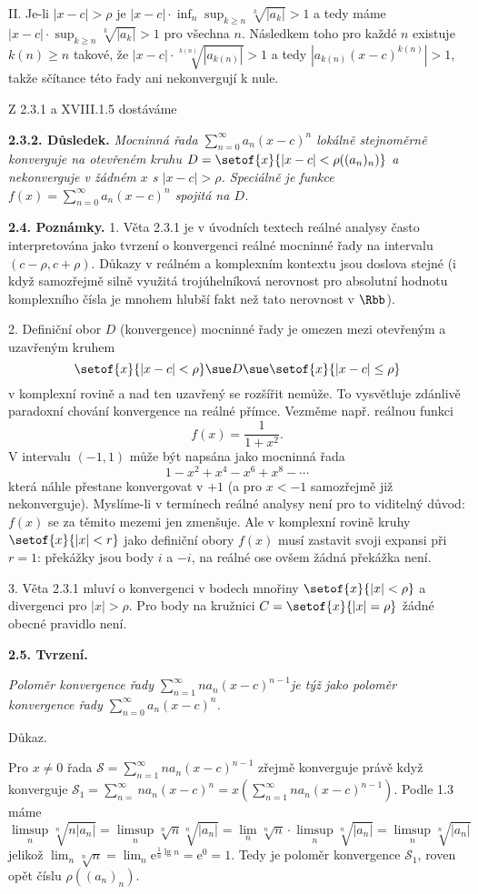 \documentclass[12pt]{article}
\begin{document}
  \smallskip
  
  II. Je-li $|x-c|>\rho$ je  $|x-c|\cdot \inf_n \sup_{k\geq n}\sqrt[k]{|a_k|}>1$ a tedy máme
  $|x-c|\cdot \sup_{k\geq n}\sqrt[k]{|a_k|}>1$ pro všechna $n$. Následkem toho pro každé $n$ existuje $k(n)\geq n$ takové, že
 $|x-c|\cdot \sqrt[k(n)]{|a_{k(n)}|}>1$ a tedy $|a_{k(n)}(x-c)^{k(n)}|>1$, takže sčítance této řady ani nekonvergují k nule.\sq

\medskip

Z 2.3.1 a XVIII.1.5 
dostáváme

\smallskip


{\bf 2.3.2. Důsledek.} {\em  Mocninná řada $\sum_{n=0}^\infty a_n(x-c)^n$ lokálně stejnoměrně konverguje na otevřeném kruhu  $D=\setof{x}{|x-c|<\rho((a_n)_n)}$ a nekonverguje v žádném $x$ s $|x-c|>\rho$. Speciálně je funkce
$f(x)=\sum_{n=0}^\infty a_n(x-c)^n$  spojitá na $D$.}

\bigskip

{\bf 2.4. Poznámky.} 1. Věta 2.3.1 je v úvodních textech reálné analysy často interpretována jako tvrzení o konvergenci reálné mocninné řady na intervalu $(c-\rho,c+\rho)$. Důkazy v reálném a komplexním kontextu jsou doslova stejné (i když samozřejmě silně využitá trojúhelníková nerovnost pro absolutní hodnotu komplexního čísla je mnohem hlubší fakt než tato nerovnost v $\Rbb$).

2. Definiční obor $D$  (konvergence) mocninné řady je omezen mezi otevřeným a uzavřeným kruhem
$$
\setof{x}{|x-c|<\rho}\sue D\sue\setof{x}{|x-c|\leq\rho}
$$ 
v komplexní rovině a nad ten uzavřený se rozšířit nemůže. To vysvětluje zdánlivě paradoxní chování konvergence na reálné přímce. Vezměme např. reálnou funkci
$$
f(x)=\frac1{1+x^2}.
$$
V intervalu $(-1,1)$ může být napsána jako mocninná řada
$$
1-x^2+x^4-x^6+x^8-\cdots
$$
která náhle přestane konvergovat v  $+1$ (a pro $x<-1$ samozřejmě již nekonverguje). 
Myslíme-li v termínech reálné analysy není pro to viditelný důvod: $f(x)$ se za těmito mezemi jen zmenšuje. Ale v komplexní rovině kruhy $\setof{x}{|x|<r}$ jako definiční obory $f(x)$ musí zastavit svoji expansi při $r=1$: překážky jsou body $i$ a $-i$, na reálné ose ovšem žádná překážka není.

3. Věta 2.3.1 mluví o konvergenci v bodech mnořiny $\setof{x}{|x|<\rho}$ a divergenci pro  $|x|>\rho$. Pro body na kružnici $C=\setof{x}{|x|=\rho}$ žádné obecné pravidlo není.

\bigskip

{\bf 2.5. Tvrzení.} {\em Poloměr konvergence řady
$\sum_{n=1}^\infty na_n(x-c)^{n-1}$je týž jako poloměr konvergence řady $\sum_{n=0}^\infty a_n(x-c)^n$.

Důkaz.} Pro $x\neq 0$ řada  $\mathcal S=\sum_{n=1}^\infty na_n(x-c)^{n-1}$ zřejmě konverguje právě když konverguje $\mathcal S_1=\sum_{n=}^\infty na_n(x-c)^{n}=x(\sum_{n=1}^\infty na_n(x-c)^{n-1})$. Podle 1.3 máme
$$
\limsup_n\sqrt[n]{n|a_n|}=\limsup_n\sqrt[n]{n}\sqrt[n]{|a_n|}=
\lim_n\sqrt[n]{n}\cdot\limsup_n\sqrt[n]{|a_n|}=\limsup_n\sqrt[n]{|a_n|}
$$
jelikož $\lim_n\sqrt[n]{n}=\lim_n\text{e}^{\frac1n\lg n}=\text{e}^0=1$. Tedy je poloměr konvergence $\mathcal S_1$,   roven opět číslu $\rho((a_n)_n)$.\sq
\end{document}
